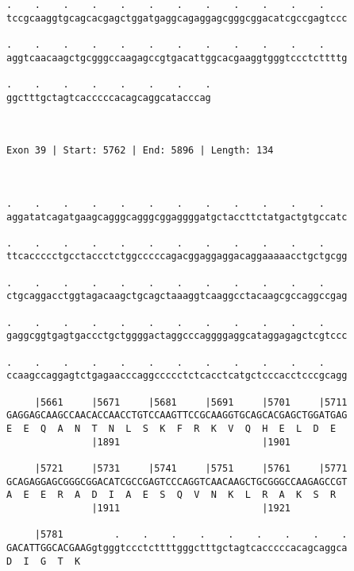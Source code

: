 \documentclass{article}
\begin{document}
\begin{Verbatim}
.    .    .    .    .    .    .    .    .    .    .    .    
tccgcaaggtgcagcacgagctggatgaggcagaggagcgggcggacatcgccgagtccc
                                                            
.    .    .    .    .    .    .    .    .    .    .    .    
aggtcaacaagctgcgggccaagagccgtgacattggcacgaaggtgggtccctcttttg
                                                            
.    .    .    .    .    .    .    .
ggctttgctagtcacccccacagcaggcatacccag
                                    
                                    
 
Exon 39 | Start: 5762 | End: 5896 | Length: 134



.    .    .    .    .    .    .    .    .    .    .    .    
aggatatcagatgaagcagggcagggcggaggggatgctaccttctatgactgtgccatc
                                                            
.    .    .    .    .    .    .    .    .    .    .    .    
ttcaccccctgcctaccctctggcccccagacggaggaggacaggaaaaacctgctgcgg
                                                            
.    .    .    .    .    .    .    .    .    .    .    .    
ctgcaggacctggtagacaagctgcagctaaaggtcaaggcctacaagcgccaggccgag
                                                            
.    .    .    .    .    .    .    .    .    .    .    .    
gaggcggtgagtgaccctgctggggactaggcccaggggaggcataggagagctcgtccc
                                                            
.    .    .    .    .    .    .    .    .    .    .    .    
ccaagccaggagtctgagaacccaggccccctctcacctcatgctcccacctcccgcagg
                                                            
     |5661     |5671     |5681     |5691     |5701     |5711
GAGGAGCAAGCCAACACCAACCTGTCCAAGTTCCGCAAGGTGCAGCACGAGCTGGATGAG
E  E  Q  A  N  T  N  L  S  K  F  R  K  V  Q  H  E  L  D  E  
               |1891                         |1901          
  
     |5721     |5731     |5741     |5751     |5761     |5771
GCAGAGGAGCGGGCGGACATCGCCGAGTCCCAGGTCAACAAGCTGCGGGCCAAGAGCCGT
A  E  E  R  A  D  I  A  E  S  Q  V  N  K  L  R  A  K  S  R  
               |1911                         |1921          
  
     |5781         .    .    .    .    .    .    .    .    .
GACATTGGCACGAAGgtgggtccctcttttgggctttgctagtcacccccacagcaggca
D  I  G  T  K                                               
                                                            

\end{Verbatim}
\end{document}
